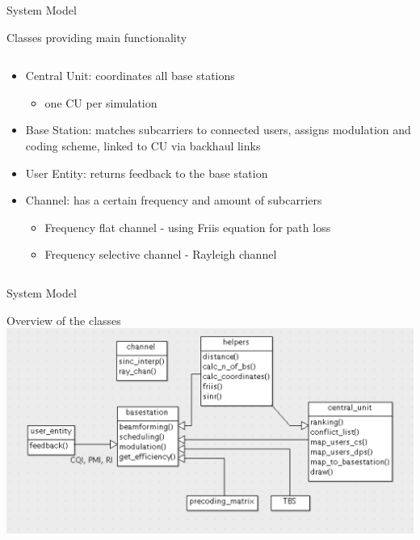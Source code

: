 \documentclass[xcolor={cmyk}]{beamer}
\begin{document}
 
  \begin{frame}{System Model}
	 \begin{block}{Classes providing main functionality}
	 	\begin{columns}
			\begin{column}{.9\textwidth}
				\begin{itemize}
					\item Central Unit: coordinates all base stations 
						\begin{itemize}
							\item one CU per simulation
						\end{itemize}
					\item Base Station: matches subcarriers to connected users, assigns modulation and coding scheme, linked to CU via backhaul links
					\item User Entity: returns feedback to the base station
					\item Channel: has a certain frequency and amount of subcarriers
					\begin{itemize}
						\item Frequency flat channel - using Friis equation for path loss
						\item Frequency selective channel - Rayleigh channel
					\end{itemize}
				\end{itemize}
			\end{column}
		\end{columns}
	 \end{block}
 \end{frame}
 
  \begin{frame}{System Model}
	 \begin{block}{Overview of the classes}
		 \includegraphics[width=\linewidth,height=\textheight,keepaspectratio]{klassen.png}
	 \end{block}
 \end{frame}
\end{document}
